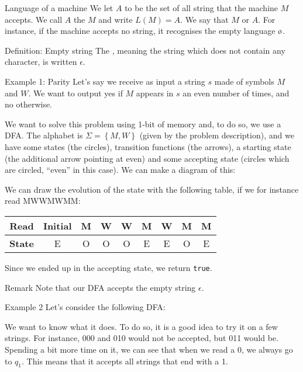 \documentclass[a4paper]{article}
\begin{document}
\begin{parag}{Language of a machine}
    We let $A$ to be the set of all string that the machine $M$ accepts. We call $A$ the  $M$ and write $L\left(M\right) = A$. We say that $M$  or  $A$. For instance, if the machine accepts no string, it recognises the empty language $\o$.

\end{parag}


\begin{parag}{Definition: Empty string}
    The , meaning the string which does not contain any character, is written $\epsilon$.
\end{parag}



\begin{parag}{Example 1: Parity}
    Let's say we receive as input a string $s$ made of symbols $M$ and $W$. We want to output yes if $M$ appears in $s$ an even number of times, and no otherwise. 

    We want to solve this problem using 1-bit of memory and, to do so, we use a DFA. The alphabet is $\Sigma = \left\{M, W\right\}$ (given by the problem description), and we have some states (the circles), transition functions (the arrows), a starting state (the additional arrow pointing at even) and some accepting state (circles which are circled, ``even'' in this case). We can make a diagram of this:

    We can draw the evolution of the state with the following table, if we for instance read MWWMWMM:
    \begin{center}
    \begin{tabular}{c|cccccccc}
        \textbf{Read} & Initial & M & W & W & M & W & M & M  \\
        \hline
        \textbf{State} & E & O & O & O & E & E & O & E
    \end{tabular}
    \end{center}

    Since we ended up in the accepting state, we return \texttt{true}.

    \begin{subparag}{Remark}
        Note that our DFA accepts the empty string $\epsilon$.
    \end{subparag}
\end{parag}

\begin{parag}{Example 2}
    Let's consider the following DFA:

    We want to know what it does. To do so, it is a good idea to try it on a few strings. For instance, 000 and 010 would not be accepted, but 011 would be. Spending a bit more time on it, we can see that when we read a 0, we always go to $q_1$. This means that it accepts all strings that end with a 1.
\end{parag}
\end{document}
